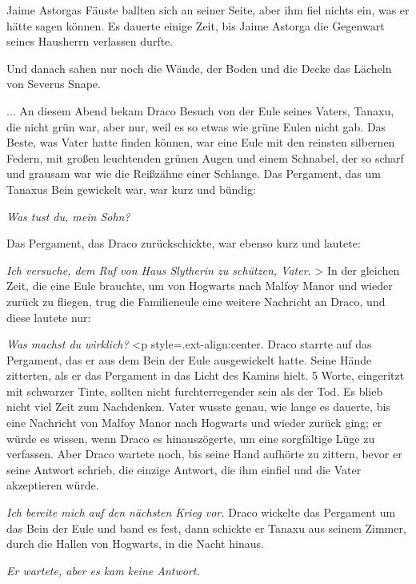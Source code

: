 Jaime Astorgas Fäuste ballten sich an seiner Seite, aber ihm fiel nichts ein,
was er hätte sagen können. Es dauerte einige Zeit, bis Jaime Astorga die
Gegenwart seines Hausherrn verlassen durfte.

Und danach sahen nur noch die Wände, der Boden und die Decke das Lächeln von
Severus Snape.

... An diesem Abend bekam Draco Besuch von der Eule seines Vaters, Tanaxu, die
nicht grün war, aber nur, weil es so etwas wie grüne Eulen nicht gab. Das Beste,
was Vater hatte finden können, war eine Eule mit den reinsten silbernen Federn,
mit großen leuchtenden grünen Augen und einem Schnabel, der so scharf und
grausam war wie die Reißzähne einer Schlange. Das Pergament, das um Tanaxus Bein
gewickelt war, war kurz und bündig:

\emph{Was tust du, mein Sohn?}

Das Pergament, das Draco zurückschickte, war ebenso kurz und lautete:\emph{}

\emph{Ich versuche, dem Ruf von Haus
Slytherin zu schützen, Vater.}    >
In der gleichen Zeit, die eine Eule brauchte, um von Hogwarts nach Malfoy Manor
und wieder zurück zu fliegen, trug die Familieneule eine weitere Nachricht an
Draco, und diese lautete nur:

\emph{Was machst du wirklich?}   <p
style=\grqq{}.ext-align:center\grqq{}.  Draco starrte auf das Pergament, das
er aus dem Bein der Eule ausgewickelt hatte. Seine Hände zitterten, als er das
Pergament in das Licht des Kamins hielt. 5 Worte, eingeritzt mit schwarzer
Tinte, sollten nicht furchterregender sein als der Tod. Es blieb nicht viel Zeit
zum Nachdenken. Vater wusste genau, wie lange es dauerte, bis eine Nachricht von
Malfoy Manor nach Hogwarts und wieder zurück ging; er würde es wissen, wenn
Draco es hinauszögerte, um eine sorgfältige Lüge zu verfassen. Aber Draco
wartete noch, bis seine Hand aufhörte zu zittern, bevor er seine Antwort
schrieb, die einzige Antwort, die ihm einfiel und die Vater akzeptieren würde.

\emph{Ich bereite mich auf den nächsten
Krieg vor.}      Draco wickelte
das Pergament um das Bein der Eule und band es fest, dann schickte er Tanaxu aus
seinem Zimmer, durch die Hallen von Hogwarts, in die Nacht hinaus.

\emph{Er wartete, aber es kam keine Antwort.}

